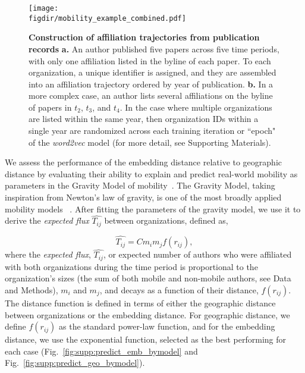 \documentclass[12pt]{article} %
\def\figdir{../Figs}
\begin{document}
%
%
\begin{figure}[ht!]
    \centering
    \texttt{[image: \\figdir/mobility\_example\_combined.pdf]}
    \caption{
        \textbf{Construction of affiliation trajectories from publication records}
        \textbf{a.}
        An author published five papers across five time periods, with only one affiliation listed in the byline of each paper.
        To each organization, a unique identifier is assigned, and they are assembled into an affiliation trajectory ordered by year of publication.
        \textbf{b.}
        In a more complex case, an author lists several affiliations on the byline of papers in $t_{2}$, $t_{3}$, and $t_{4}$. 
        In the case where multiple organizations are listed within the same year, then organization IDs within a single year are randomized across each training iteration or ``epoch" of the \textit{word2vec} model (for more detail, see Supporting Materials). 
    }
    \label{fig:methods:mobility_sentence}
\end{figure}

We assess the performance of the embedding distance relative to geographic distance by evaluating their ability to explain and predict real-world mobility as parameters in the Gravity Model of mobility~\autocite{zipf1946gravity, barbosa2018human}.
The Gravity Model, taking inspiration from Newton's law of gravity, is one of the most broadly applied mobility models~\autocite{curiel2018citygravity, lewer2008immigrationgravity, jung2008highwaygravity, hong2016busgravity, truscott2012epidemicgravity, xia2005measlesgravity} . After fitting the parameters of the gravity model, we use it to derive the \textit{expected flux} $\hat{T_{ij}}$ between organizations, defined as,


\begin{equation}
	\label{eq:gravity_basic}
	\hat{T_{ij}} = Cm_{i}m_{j}f(r_{ij}),
\end{equation}
where the \textit{expected flux}, $\hat{T_{ij}}$, or expected number of authors who were affiliated with both organizations during the time period is proportional to the organization's sizes (the sum of both mobile and non-mobile authors, see Data and Methods), $m_{i}$ and $m_{j}$, and decays as a function of their distance, $f(r_{ij})$.
The distance function is defined in terms of either the geographic distance between organizations or the embedding distance. 
For geographic distance, we define $f(r_{ij})$ as the standard power-law function, and for the embedding distance, we use the exponential function, selected as the best performing for each case (Fig.~\ref{fig:supp:predict_emb_bymodel} and Fig.~\ref{fig:supp:predict_geo_bymodel}).
\end{document}
